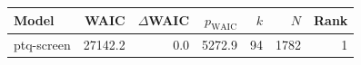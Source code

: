 \begin{tabular}{lrrrrrr}
\toprule
Model & WAIC & $\Delta$WAIC & $p_{\mathrm{WAIC}}$ & $k$ & $N$ & Rank \\
\midrule
ptq-screen & 27142.2 & 0.0 & 5272.9 & 94 & 1782 & 1 \\
\bottomrule
\end{tabular}
